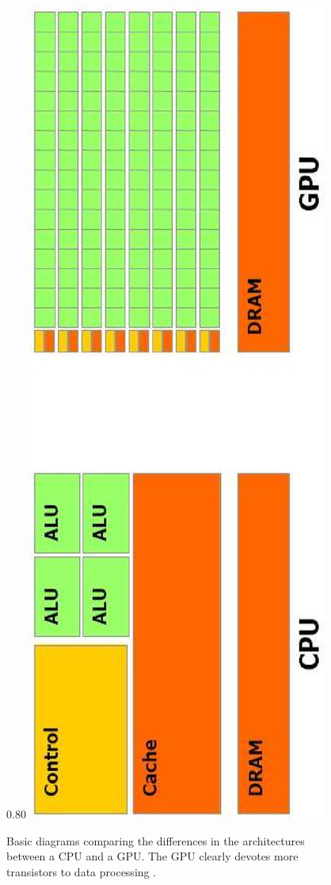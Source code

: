 \begin{figure}[ht]
\begin{center}
 \scalebox
 {0.80} %
 {
 \includegraphics[angle=270,scale=0.5]{images/gpu_images/cpu_vs_gpu_arch.eps}
 }
\end{center}
\caption{Basic diagrams comparing the differences in the architectures between a CPU and a GPU.  The GPU clearly devotes more transistors to data processing \cite{Nvidia08}.}
\label{fig:cpu_vs_gpu_arch}
\end{figure}


